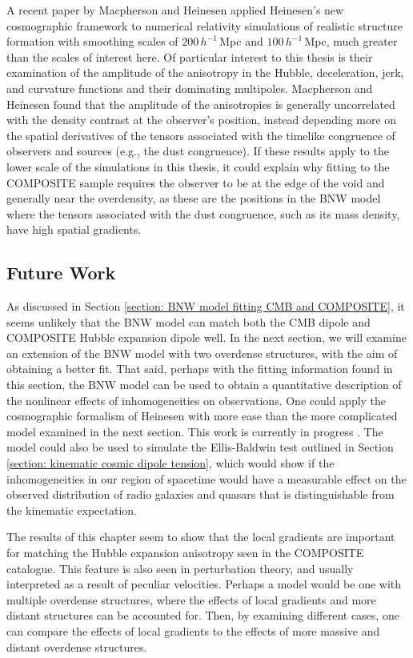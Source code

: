 \documentclass[a4paper,12pt]{report}
\begin{document}
A recent paper by Macpherson and Heinesen \cite{RN238} applied Heinesen's new cosmographic framework to numerical relativity simulations of realistic structure formation with smoothing scales of $200\, h^{-1}\,$Mpc and $100\, h^{-1}\,$Mpc, much greater than the scales of interest here. Of particular interest to this thesis is their examination of the amplitude of the anisotropy in the Hubble, deceleration, jerk, and curvature functions and their dominating multipoles. Macpherson and Heinesen found that the amplitude of the anisotropies is generally uncorrelated with the density contrast at the observer's position, instead depending more on the spatial derivatives of the tensors associated with the timelike congruence of observers and sources (e.g., the dust congruence). If these results apply to the lower scale of the simulations in this thesis, it could explain why fitting to the COMPOSITE sample requires the observer to be at the edge of the void and generally near the overdensity, as these are the positions in the BNW model where the tensors associated with the dust congruence, such as its mass density, have high spatial gradients.

\subsection{Future Work}
As discussed in Section \ref{section: BNW model fitting CMB and COMPOSITE}, it seems unlikely that the BNW model can match both the CMB dipole and COMPOSITE Hubble expansion dipole well. In the next section, we will examine an extension of the BNW model with two overdense structures, with the aim of obtaining a better fit. That said, perhaps with the fitting information found in this section, the BNW model can be used to obtain a quantitative description of the nonlinear effects of inhomogeneities on observations. One could apply the cosmographic formalism of Heinesen \cite{RN235} with more ease than the more complicated model examined in the next section. This work is currently in progress \cite{RN261}. The model could also be used to simulate the Ellis-Baldwin test outlined in Section \ref{section: kinematic cosmic dipole tension}, which would show if the inhomogeneities in our region of spacetime would have a measurable effect on the observed distribution of radio galaxies and quasars that is distinguishable from the kinematic expectation.

The results of this chapter seem to show that the local gradients are important for matching the Hubble expansion anisotropy seen in the COMPOSITE catalogue. This feature is also seen in perturbation theory, and usually interpreted as a result of peculiar velocities. Perhaps a model would be one with multiple overdense structures, where the effects of local gradients and more distant structures can be accounted for. Then, by examining different cases, one can compare the effects of local gradients to the effects of more massive and distant overdense structures.
\end{document}
